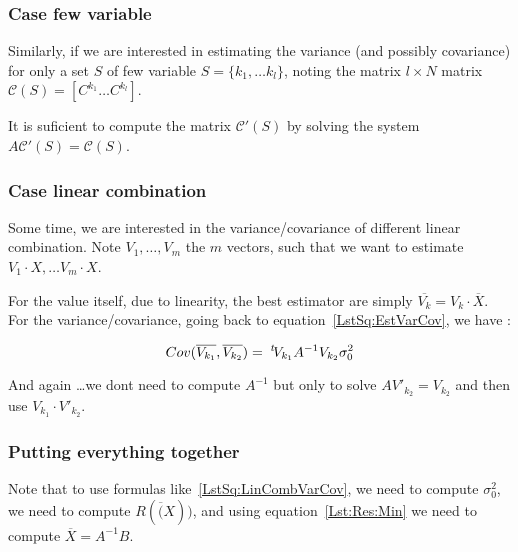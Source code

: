 \subsubsection{Case few variable}

Similarly, if we are interested in estimating the variance (and possibly covariance)  for
only a set $S$ of  few variable $S=\{k_1,\dots k_l\}$, noting the matrix $l \times N$
matrix $\mathcal{C}(S) = [C^{k_1} \dots C^{k_l}]$.

It is suficient to compute the  matrix $ \mathcal{C}'(S)$ by
solving  the system $A \mathcal{C}'(S) = \mathcal{C}(S)$.

\subsubsection{Case linear combination}

Some time, we are interested in the variance/covariance  of  different linear combination.
Note $V_1, \dots ,V_m$ the $m$ vectors, such that  we want to estimate $V_1 \cdot X, \dots V_m \cdot X$.

For the value itself, due to linearity, the best estimator are simply $\overline{V_k} = V_k \cdot \overline X$.
For the variance/covariance, going back to equation~\ref{LstSq:EstVarCov}, we have :


\begin{equation}
	Cov(\overline{V_{k_1}},\overline{V_{k_2}})  =  \; ^{t} \! V_{k_1} A^{-1} V_{k_2}  \sigma_0^2 \label{LstSq:LinCombVarCov}
\end{equation}

And again \dots we dont need to compute $ A^{-1}$ but only to solve $A V'_{k_2}  = V_{k_2}$ and then use $V_{k_1} \cdot V'_{k_2}$.

\subsubsection{Putting everything together}

\label{LstSq:Uncer:AllTog}

Note that to use formulas like~\ref{LstSq:LinCombVarCov}, we need to compute $\sigma_0^2$,  we need to compute $R(\overline(X))$,
and using equation~\ref{Lst:Res:Min}  we need to compute  $ \overline{X} =  A^{-1} B$.

